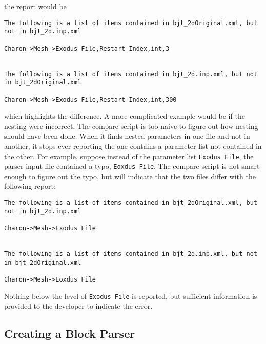 the report would be
\begin{lstlisting}
The following is a list of items contained in bjt_2dOriginal.xml, but not in bjt_2d.inp.xml

Charon->Mesh->Exodus File,Restart Index,int,3


The following is a list of items contained in bjt_2d.inp.xml, but not in bjt_2dOriginal.xml

Charon->Mesh->Exodus File,Restart Index,int,300
\end{lstlisting}
which highlights the difference.  A more complicated example would be
if the nesting were incorrect.  The compare script is too naive to
figure out how nesting should have been done.  When it finds nested
parameters in one file and not in another, it stops ever reporting the
one contains a parameter list not contained in the other.  For
example, suppose instead of the parameter list \texttt{Exodus File},
the parser input file contained a typo, \texttt{Eoxdus File}.  The
compare script is not smart enough to figure out the typo, but will
indicate that the two files differ with the following report:
\begin{lstlisting}
The following is a list of items contained in bjt_2dOriginal.xml, but not in bjt_2d.inp.xml

Charon->Mesh->Exodus File


The following is a list of items contained in bjt_2d.inp.xml, but not in bjt_2dOriginal.xml

Charon->Mesh->Eoxdus File
\end{lstlisting}
Nothing below the level of \texttt{Exodus File} is reported, but
sufficient information is provided to the developer to indicate the
error.

\subsection{Creating a Block Parser}

